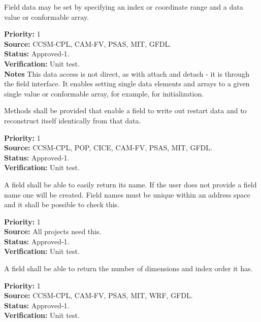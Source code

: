Field data may be set by specifying an index or coordinate range 
and a data value or conformable array.
\begin{reqlist}
{\bf Priority:} 1 \\
{\bf Source:} CCSM-CPL, CAM-FV, PSAS, MIT, GFDL. \\
{\bf Status:} Approved-1. \\
{\bf Verification:} Unit test. \\
{\bf Notes} This data access is not direct, as with attach and detach - 
it is through the field interface.  It enables setting single data elements
and arrays to a given single value or conformable array, for example,
for initialization.
\end{reqlist}

Methods shall be provided that enable a field to write out restart data and
to reconstruct itself identically from that data.
\begin{reqlist}
{\bf Priority:} 1 \\
{\bf Source:} CCSM-CPL, POP, CICE, CAM-FV, PSAS, MIT, GFDL. \\
{\bf Status:} Approved-1. \\
{\bf Verification:} Unit test. 
\end{reqlist}


A field shall be able to easily return its name.  If the user does not
provide a field name one will be created.  Field names must be unique
within an address space and it shall be possible to check this.
\begin{reqlist}
{\bf Priority:} 1 \\
{\bf Source:} All projects need this. \\
{\bf Status:} Approved-1. \\
{\bf Verification:} Unit test. 
\end{reqlist}

A field shall be
able to return the number of dimensions and index order it has.
\begin{reqlist}
{\bf Priority:} 1 \\
{\bf Source:} CCSM-CPL, CAM-FV, PSAS, MIT, WRF, GFDL. \\
{\bf Status:} Approved-1. \\
{\bf Verification:} Unit test. 
\end{reqlist}

